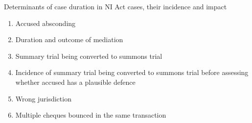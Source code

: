 Determinants of case duration in NI Act cases, their incidence and impact
\begin{enumerate}
\item Accused absconding
\item Duration and outcome of mediation
\item Summary trial being converted to summons trial
\item Incidence of summary trial being converted to summons trial
  before assessing whether accused has a plausible defence
\item Wrong jurisdiction
\item Multiple cheques bounced in the same transaction
\end{enumerate}


